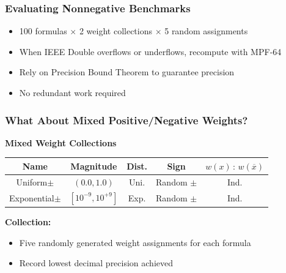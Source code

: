 \documentclass[t,pdf]{beamer}
\newcommand{\obar}[1]{\overline{#1}}
\begin{document}
\begin{frame}

\frametitle{Evaluating Nonnegative Benchmarks}

\bigskip


\medskip

\begin{itemize}
\item 100 formulas $\times$ 2 weight collections $\times$ 5 random assignments
\item When IEEE Double overflows or underflows, recompute with MPF-64
\item Rely on Precision Bound Theorem to guarantee precision
\item No redundant work required
\end{itemize}

\end{frame}


\begin{frame}
  \frametitle{What About Mixed Positive/Negative Weights?}

\medskip

  \textbf{Mixed Weight Collections}

\begin{center}
   \begin{tabular}{ccccc}
     Name & Magnitude  & Dist. & Sign & $w(x)\,:\,w(\obar{x})$ \\
     \midrule
     Uniform$\pm$      & $(0.0, 1.0)$     & Uni.  & Random $\pm$   & Ind. \\[0.5em]
     Exponential$\pm$ & $[10^{-9}, 10^{+9}]$ & Exp. & Random $\pm$ & Ind. \\
   \end{tabular}
\end{center}

\bigskip

\textbf{Collection:}

  \begin{itemize}
    \item Five randomly generated weight assignments for each formula
    \item Record lowest decimal precision achieved
  \end{itemize}

\end{frame}
\end{document}
